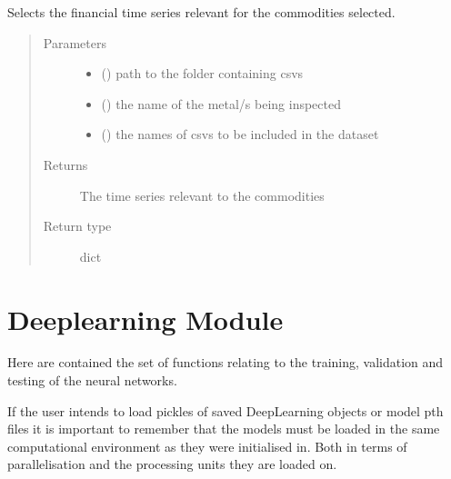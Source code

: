 \documentclass[letterpaper,10pt,english]{sphinxmanual}
\begin{document}
\begin{fulllineitems}
\label{\detokenize{preprocessing:Foresight.preprocessing.universe_select}}
Selects the financial time series relevant for the commodities selected.
\begin{quote}\begin{description}
\item[{Parameters}] \leavevmode\begin{itemize}
\item {} 
 () \textendash{} path to the folder containing csvs

\item {} 
 () \textendash{} the name of the metal/s being inspected

\item {} 
 () \textendash{} the names of csvs to be included in the dataset

\end{itemize}

\item[{Returns}] \leavevmode
The time series relevant to the commodities

\item[{Return type}] \leavevmode
dict

\end{description}\end{quote}

\end{fulllineitems}



\section{Deeplearning Module}
\label{\detokenize{deeplearning:deeplearning-module}}\label{\detokenize{deeplearning::doc}}
Here are contained the set of functions relating to the training,
validation and testing of the neural networks.

If the user intends to load pickles of saved DeepLearning objects or model pth
files it is important to remember that the models must be loaded in the same
computational environment as they were initialised in. Both in terms of
parallelisation and the processing units they are loaded on.
\end{document}
